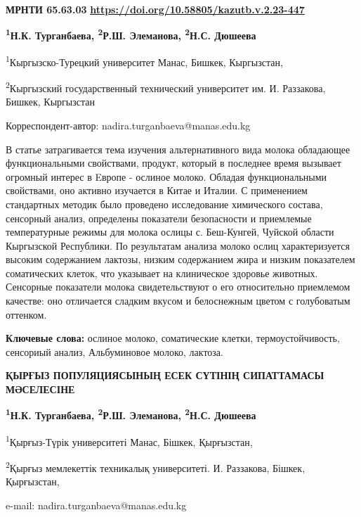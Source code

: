 \newpage
{\bfseries МРНТИ 65.63.03}
\hfill {\bfseries \href{https://doi.org/10.58805/kazutb.v.2.23-447}{https://doi.org/10.58805/kazutb.v.2.23-447}}


\begin{center}
{\bfseries \textsuperscript{1}Н.К. Турганбаева\envelope, \textsuperscript{2}Р.Ш. Элеманова, \textsuperscript{2}Н.С. Дюшеева}

\textsuperscript{1}Кыргызско-Турецкий университет Манас, Бишкек,
Кыргызстан,

\textsuperscript{2}Кыргызский государственный технический университет
им. И. Раззакова, Бишкек, Кыргызстан

\envelope Корреспондент-автор: nadira.turganbaeva@manas.edu.kg
\end{center}

В статье затрагивается тема изучения альтернативного вида молока
обладающее функциональными свойствами, продукт, который в последнее
время вызывает огромный интерес в Eвропе - ослиное молоко. Обладая
функциональными свойствами, оно активно изучается в Китае и Италии. С
применением стандартных методик было проведено исследование химического
состава, сенсорный анализ, определены показатели безопасности и
приемлемые температурные режимы для молока ослицы с. Беш-Кунгей, Чуйской
области Кыргызской Республики. По результатам анализа молоко ослиц
характеризуется высоким содержанием лактозы, низким содержанием жира и
низким показателем соматических клеток, что указывает на клиническое
здоровье животных. Сенсорные показатели молока свидетельствуют о его
относительно приемлемом качестве: оно отличается сладким вкусом и
белоснежным цветом с голубоватым оттенком.

{\bfseries Ключевые слова:} ослиное молоко, соматические клетки,
термоустойчивость, сенсориый анализ, Альбуминовое молоко, лактоза.

\begin{center}
{\large\bfseries ҚЫРҒЫЗ ПОПУЛЯЦИЯСЫНЫҢ ЕСЕК СҮТІНІҢ СИПАТТАМАСЫ МӘСЕЛЕСІНЕ}

{\bfseries \textsuperscript{1}Н.К. Турганбаева\envelope, \textsuperscript{2}Р.Ш. Элеманова, \textsuperscript{2}Н.С. Дюшеева}

\textsuperscript{1}Қырғыз-Түрік университеті Манас, Бішкек, Қырғызстан,

\textsuperscript{2}Қырғыз мемлекеттік техникалық университеті. И.
Раззакова, Бішкек, Қырғызстан,

e-mail: nadira.turganbaeva@manas.edu.kg
\end{center}


